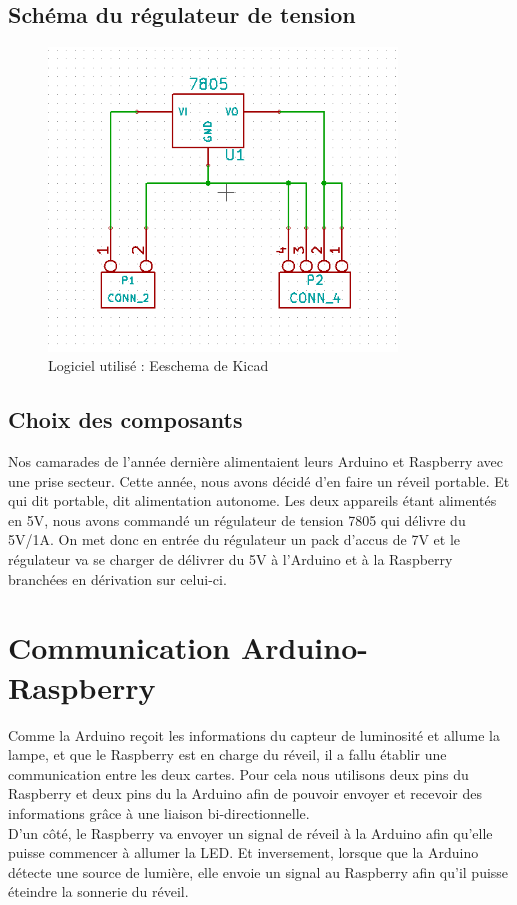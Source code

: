\subsection{Schéma du régulateur de tension}
\begin{figure}[h]
	\centering
	\includegraphics[width=350px]{images/SchemaDuRegulateur.png}
	\caption{Logiciel utilisé : Eeschema de Kicad}
\end{figure}

\subsection{Choix des composants} 
	Nos camarades de l'année dernière alimentaient leurs Arduino et Raspberry avec une prise secteur. Cette année, nous avons décidé d'en faire un réveil portable. Et qui dit portable, dit alimentation autonome. Les deux appareils étant alimentés en 5V, nous avons commandé un régulateur de tension 7805 qui délivre du 5V/1A. On met donc en entrée du régulateur un pack d'accus de 7V et le régulateur va se charger de délivrer du 5V à l'Arduino et à la Raspberry branchées en dérivation sur celui-ci.

\section{Communication Arduino-Raspberry}
	Comme la Arduino reçoit les informations du capteur de luminosité et allume la lampe, et que le Raspberry est en charge du réveil, il a fallu établir une communication entre les deux cartes. Pour cela nous utilisons deux pins du Raspberry et deux pins du la Arduino afin de pouvoir envoyer et recevoir des informations grâce à une liaison bi-directionnelle.\\

	D'un côté, le Raspberry va envoyer un signal de réveil à la Arduino afin qu'elle puisse commencer à allumer la LED. Et inversement, lorsque que la Arduino détecte une source de lumière, elle envoie un signal au Raspberry afin qu'il puisse éteindre la sonnerie du réveil.